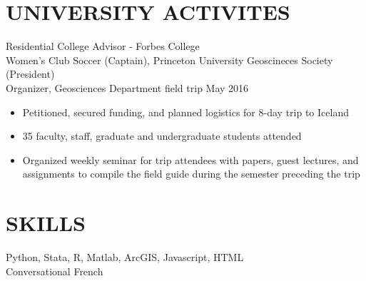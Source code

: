 \documentclass[overlapped, 11pt]{res} %
\begin{document}
\begin{resume}

\section{UNIVERSITY ACTIVITES}
Residential College Advisor - Forbes College \\
Women's Club Soccer (Captain), Princeton University Geoscineces Society (President)\\
Organizer, Geosciences Department field trip May 2016
\begin{itemize} \itemsep -2pt
\item Petitioned, secured funding, and planned logistics for 8-day trip to Iceland
\item 35 faculty, staff, graduate and undergraduate students attended
\item Organized weekly seminar for trip attendees with papers, guest lectures, and assignments to compile the field guide during the semester preceding the trip
\end{itemize}

\vspace{-10pt}
\section{SKILLS} 
\vspace{3pt}
Python, Stata, R, Matlab, ArcGIS, Javascript, HTML\\
Conversational French

 


\end{resume}
\end{document}
